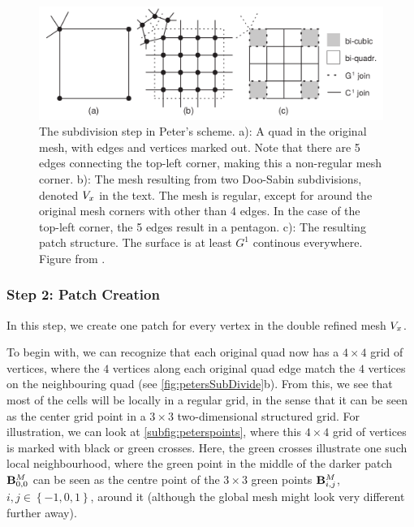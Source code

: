 \begin{figure}
	\centering
	\includegraphics[width = \textwidth]{Pictures/NURBS/petersQuad_to_patches.png}
	\caption{The subdivision step in Peter's scheme. a): A quad in the original mesh, with edges and vertices marked out. Note that there are 5 edges connecting the top-left corner, making this a non-regular mesh corner. b): The mesh resulting from two Doo-Sabin subdivisions, denoted $\petersPatchPoints$ in the text. The mesh is regular, except for around the original mesh corners with other than 4 edges. In the case of the top-left corner, the 5 edges result in a pentagon. c): The resulting \Bez patch structure. The surface is at least $G^1$ continous everywhere. Figure from \cite{eck1996automatic}.}
	\label{fig:petersSubDivide}
\end{figure}

\subsubsection{Step 2: \Bez Patch Creation}
In this step, we create one \Bez patch for every vertex in the double refined mesh $\petersPatchPoints$. 

To begin with, we can recognize that each original quad now has a $4 \times 4$ grid of vertices, where the $4$ vertices along each original quad edge match the $4$ vertices on the neighbouring quad (see \autoref{fig:petersSubDivide}b). From this, we see that most of the cells will be locally in a regular grid, in the sense that it can be seen as the center grid point in a $3\times3$ two-dimensional structured grid. For illustration, we can look at \autoref{subfig:peterspoints}, where this $4 \times 4$ grid of vertices is marked with black or green crosses. Here, the green crosses illustrate one such local neighbourhood, where the green point in the middle of the darker patch $\petersLocalPatchPointIndices{0,0}$ can be seen as the centre point of the $3 \times 3$ green points $\petersLocalPatchPointIndices{i,j}$, $i,j \in \left \lbrace-1,0,1\right \rbrace$, around it (although the global mesh might look very different further away).%


